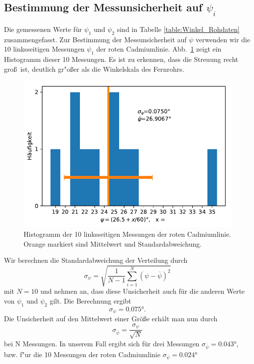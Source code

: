 \documentclass[12pt,a4paper]{article}
\begin{document}
\subsection{Bestimmung der Messunsicherheit auf  $\psi_i$}
Die gemessenen Werte für $\psi_{1}$ und $\psi_2$ sind in Tabelle \ref{table:Winkel_Rohdaten} zusammengefasst. Zur Bestimmung der Messunsicherheit auf $\psi$ verwenden wir die 10 linksseitigen Messungen $\psi_1$ der roten Cadmiumlinie. Abb.~\ref{Histogramm} zeigt ein Histogramm dieser 10 Messungen. Es ist zu erkennen, dass die Streuung recht gro\ss\ ist, deutlich gr"o\ss er als die Winkelskala des Fernrohrs.
\begin{figure}[H]
	\centering
	\includegraphics[width=0.8\linewidth]{Python/Histogramm_Psi.pdf}
	\caption{Histogramm der 10 linksseitigen Messungen der roten Cadmiumlinie.\\Orange markiert sind Mittelwert und Standardabweichung.}
	\label{Histogramm}
\end{figure}
Wir berechnen die Standardabweichung der Verteilung durch
\begin{equation}
\sigma_{\psi}=\sqrt{\frac{1}{N-1}\sum^{N}_{i=1}{(\psi-\overline{\psi})^2}}
\end{equation}
mit $N=10$ und nehmen an, dass diese Unsicherheit auch für die anderen Werte von $\psi_1$ und $\psi_2$ gilt. Die Berechnung ergibt
\begin{equation}
\sigma_{\psi}=\ang{0.075}.
\end{equation}
Die Unsicherheit auf den Mittelwert einer Größe erhält man nun durch
\begin{equation}
\sigma_{\overline{\psi}}=\frac{\sigma_{\psi}}{\sqrt{N}}
\end{equation}
bei N Messungen.  In unserem Fall ergibt sich für drei Messungen $\sigma_{\overline{\psi}}=\ang{0.043}$, bzw. f"ur die 10 Messungen der roten Cadmiumlinie $\sigma_{\overline{\psi}}=\ang{0.024}$
\end{document}
